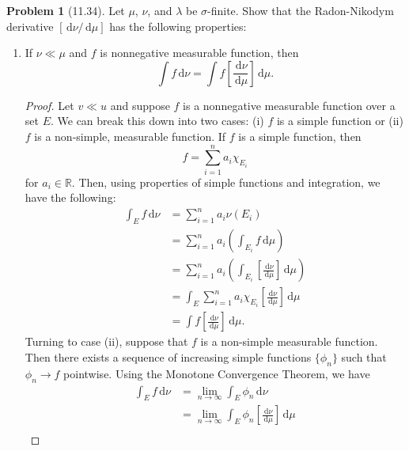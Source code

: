 \documentclass[12pt]{article}
\newcommand{\R}{\mathbb{R}}
\newcommand{\dif}{\, \mathrm{d}}
\theoremstyle{definition}
\newtheorem{problem}{Problem}
\begin{document}
\begin{problem}[11.34] Let \( \mu \),  \( \nu \), and \( \lambda \) be \( \sigma \)-finite. Show that the Radon-Nikodym derivative \( [\dif\nu/ \dif\mu] \) has the following properties:
    \begin{enumerate}[label = \alph{*}.]
        \item  If \( \nu \ll \mu \) and \( f \) is nonnegative measurable function, then 
            \[
                \int f \dif \nu = \int f \left[ \frac{\dif \nu}{\dif \mu}       \right] \dif \mu.    
            \]
                \begin{proof}
                    Let \( v \ll u \) and suppose \( f \) is a nonnegative measurable function over a set \( E \). We can break this down into two cases: (i) \( f \) is a simple function or (ii) \( f \) is a non-simple, measurable function. 
                    If \( f \) is a simple function, then
                        \[
                            f = \sum_{i=1}^{n} a_i \chi_{E_{i}}
                        \]
                    for \( a_i \in \R \). Then, using properties of simple functions and integration, we have the following:
                        \begin{align*}
                            \int_{E} f \dif \nu &= \sum_{i=1}^{n} a_i \nu(E_i)\\
                            &= \sum_{i=1}^{n} a_i \left( \int_{E_i} f \dif \mu \right) \\
                            &= \sum_{i=1}^{n} a_i \left( \int_{E_i} \left[ \frac{\dif \nu}{\dif \mu} \right] \dif \mu \right) \\
                            &= \int_{E} \sum_{i=1}^{n} a_i \chi_{E_{i}} \left[ \frac{\dif \nu}{\dif \mu} \right] \dif \mu \\
                            &= \int f \left[ \frac{\dif \nu}{\dif \mu} \right] \dif \mu.
                        \end{align*}
                Turning to case (ii), suppose that \( f \) is a non-simple measurable function.
                Then there exists a sequence of increasing simple functions \( \{ \phi_n\} \) such that \( \phi_n \to f \) pointwise. 
                Using the Monotone Convergence Theorem, we have 
                        \begin{align*}
                            \int_{E} f \dif \nu &= \lim_{n \to \infty} \int_{E} \phi_n \dif \nu \\
                            &= \lim_{n \to \infty} \int_{E} \phi_n \left[ \frac{\dif \nu}{\dif \mu} \right] \dif \mu \\

\end{align*}
\end{proof}
\end{enumerate}
\end{problem}
\end{document}
